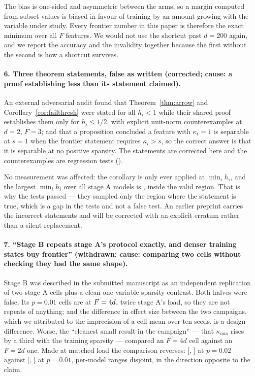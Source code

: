 The bias is one-sided and asymmetric between the arms, so a margin computed from subset values is
biased in favour of training by an amount growing with the variable under study. Every frontier
number in this paper is therefore the exact minimum over all $F$ features. We would not use the
shortcut past $d=200$ again, and we report the accuracy and the invalidity together because the first
without the second is how a shortcut survives.

\paragraph{6. Three theorem statements, false as written (corrected; cause: a proof establishing less
than its statement claimed).} An external adversarial audit found that
Theorem~\ref{thm:arrow} and Corollary~\ref{cor:failthresh} were stated for all $h_i<1$ while their
shared proof establishes them only for $h_i\le 1/2$, with explicit unit-norm counterexamples at
$d=2$, $F=3$; and that a proposition concluded a feature with $\kappa_i=1$ is separable at $s=1$ when
the frontier statement requires $\kappa_i>s$, so the correct answer is that it is separable at no
positive sparsity. The statements are corrected here and the counterexamples are regression tests
().

No measurement was affected: the corollary is only ever applied at $\min_i h_i$, and the largest
$\min_i h_i$ over all \KdThreeModels{} stage A models is \KdThreeMaxLevMin, inside the valid
region. That is why the tests
passed --- they sampled only the region where the statement is true, which is a gap in the tests and
not a false test. An earlier preprint carries the incorrect statements and will be corrected with an
explicit erratum rather than a silent replacement.

\paragraph{7. ``Stage B repeats stage A's protocol exactly, and denser training states buy frontier''
(withdrawn; cause: comparing two cells without checking they had the same shape).} Stage B was
described in the submitted manuscript as an independent replication of two stage A cells plus a
clean one-variable sparsity contrast. Both halves were false. Its $p=0.01$ cells are at
$F=4 d$, twice stage A's load, so they are not repeats of anything; and the difference in
effect size between the two campaigns, which we attributed to the imprecision of a cell mean over ten
seeds, is a design difference. Worse, the ``cleanest small result in the campaign'' --- that
$\kappa_{\min}$ rises by a third with the training sparsity --- compared an $F=4d$ cell against an
$F=2d$ one. Made at matched load the comparison reverses: \SbMatchPtwoKappa{}
[\SbMatchPtwoKappaLo, \SbMatchPtwoKappaHi] at $p=0.02$ against \SbMatchPoneKappa{}
[\SbMatchPoneKappaLo, \SbMatchPoneKappaHi] at $p=0.01$, per-model ranges disjoint, in the direction
opposite to the claim.


